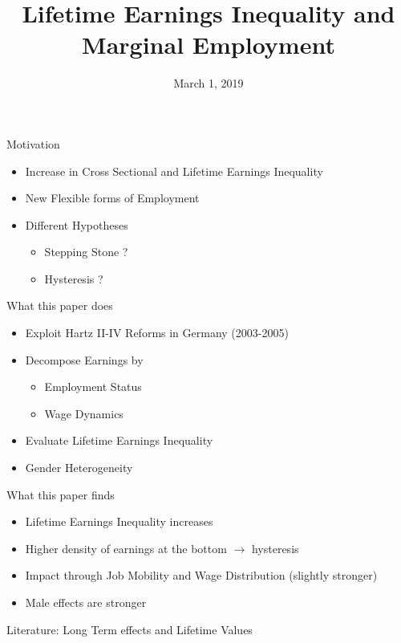 \documentclass{beamer}
\title{Lifetime Earnings Inequality and Marginal Employment}
\author[Short Name (U ABC)]{%
  \texorpdfstring{%
    \begin{columns}
      \column{.5\linewidth}
      \centering
Manuel Sanchez
    \end{columns}
 }
{Author 1}
}
\institute{University of Bristol}
\date{March 1, 2019}
\begin{document}
\begin{frame}
  \titlepage
\end{frame}

\begin{frame}{Motivation}\label{Motivation_1}
\begin{itemize}
\item Increase in Cross Sectional and Lifetime Earnings Inequality
\vfill
\item New Flexible forms of Employment
\vfill
\item Different Hypotheses
\vfill
\begin{itemize}
\item Stepping Stone ?
\vfill
\item Hysteresis ?
\end{itemize}
\end{itemize}
\hyperlink{LTEI_App}{}
\hyperlink{Literature}{}
\end{frame}

\begin{frame}{What this paper does}\label{Assumption}
\begin{itemize}
\setlength{\itemsep}{0.5 cm}
\item Exploit Hartz II-IV Reforms in Germany (2003-2005)
\item Decompose Earnings by 
\begin{itemize}
\vspace{5mm}
\setlength{\itemsep}{0.5 cm}
\item Employment Status
\item Wage Dynamics
\end{itemize}
\item Evaluate Lifetime Earnings Inequality
\item Gender Heterogeneity
\end{itemize}
\hyperlink{LTEI_App}{}
\end{frame}

\begin{frame}{What this paper finds}\label{finds}
\begin{itemize}
\setlength{\itemsep}{0.5 cm}
\item Lifetime Earnings Inequality increases 
\item Higher density of earnings at the bottom $\rightarrow$ hysteresis
\item Impact through Job Mobility and Wage Distribution (slightly stronger)
\item Male effects are stronger
\end{itemize}
\vfill
Literature: Long Term effects and Lifetime Values
\end{frame}
\end{document}
